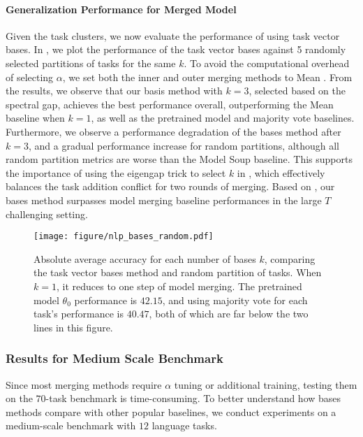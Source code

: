 \paragraph{Generalization Performance for Merged Model} Given the task clusters, we now evaluate the performance of using task vector bases. In , we plot the performance of the task vector bases against 5 randomly selected partitions of tasks for the same $k$. To avoid the computational overhead of selecting $\alpha$, we set both the inner and outer merging methods to Mean \citep{pmlr-v162-wortsman22a}. From the results, we observe that our basis method with $k = 3$, selected based on the spectral gap, achieves the best performance overall, outperforming the Mean baseline when $k = 1$, as well as the pretrained model and majority vote baselines. Furthermore, we observe a performance degradation of the bases method after $k = 3$, and a gradual performance increase for random partitions, although all random partition metrics are worse than the Model Soup baseline. This supports the importance of using the eigengap trick to select $k$ in , which effectively balances the task addition conflict for two rounds of merging. Based on , our bases method surpasses model merging baseline performances in the large $T$ challenging setting.


\begin{figure}[tb]
    \centering
    \texttt{[image: figure/nlp\_bases\_random.pdf]}

    \caption{Absolute average accuracy for each number of bases $k$, comparing the task vector bases method and random partition of tasks. When $k = 1$, it reduces to one step of model merging. The pretrained model $\theta_0$ performance is $42.15$, and using majority vote for each task’s performance is $40.47$, both of which are far below the two lines in this figure.}
    \label{fig:bases_random}
\end{figure}


\subsubsection{Results for Medium Scale Benchmark}

Since most merging methods require $\alpha$ tuning or additional training, testing them on the $70$-task benchmark is time-consuming. To better understand how bases methods compare with other popular baselines, we conduct experiments on a medium-scale benchmark with $12$ language tasks.

